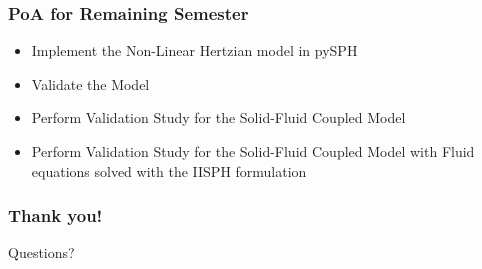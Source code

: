 \documentclass{beamer}
\begin{document}
 \begin{frame} %
  \frametitle{PoA for Remaining Semester}
  \begin{itemize}
   \item Implement the Non-Linear Hertzian model in pySPH
   \item Validate the Model \pause
   \item Perform Validation Study for the Solid-Fluid Coupled Model \pause
   \item Perform Validation Study for the Solid-Fluid Coupled Model with Fluid equations  solved with the IISPH formulation
  \end{itemize}
 \end{frame}

 \begin{frame} %
  \frametitle{Thank you!}

  \begin{center}
    \large{Questions?}   
  \end{center}    
  
 \end{frame}
\end{document}
